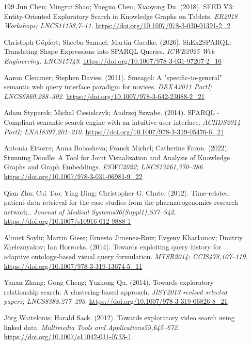 \documentclass[manuscript,review,screen]{acmart}
\begin{document}
\begin{thebibliography}{199}
 Jun Chen; Mingrui Shao; Yueguo Chen; Xiaoyong Du. (2018). SEED V3: Entity-Oriented Exploratory Search in Knowledge Graphs on Tablets. \textit{ER2018 Workshops; LNCS11158,7--11}. \url{https://doi.org/10.1007/978-3-030-01391-2_2}

 Christoph G\"{o}pfert; Sheeba Samuel; Martin Gaedke. (2026). ShEx2SPARQL: Translating Shape Expressions into SPARQL Queries. \textit{ICWE2025 Web Engineering, LNCS15749}. \url{https://doi.org/10.1007/978-3-031-97207-2_16}

 Aaron Clemmer; Stephen Davies. (2011). Smeagol: A "specific-to-general" semantic web query interface paradigm for novices. \textit{DEXA2011 PartI; LNCS6860,288--302}. \url{https://doi.org/10.1007/978-3-642-23088-2_21}

 Adam Styperek; Michal Ciesielczyk; Andrzej Szwabe. (2014). SPARQL - Compliant semantic search engine with an intuitive user interface. \textit{ACIIDS2014 PartI; LNAI8397,201--210}. \url{https://doi.org/10.1007/978-3-319-05476-6_21}

 Antonia Ettorre; Anna Bobasheva; Franck Michel; Catherine Faron. (2022). Stunning Doodle: A Tool for Joint Visualization and Analysis of Knowledge Graphs and Graph Embeddings. \textit{ESWC2022; LNCS13261,370--386}. \url{https://doi.org/10.1007/978-3-031-06981-9_22}

 Qian Zhu; Cui Tao; Ying Ding; Christopher G. Chute. (2012). Time-related patient data retrieval for the case studies from the pharmacogenomics research network.. \textit{Journal of Medical Systems36(Suppl1),S37--S42}. \url{https://doi.org/10.1007/s10916-012-9888-1}

 Ahmet Soylu; Martin Giese; Ernesto Jimenez-Ruiz; Evgeny Kharlamov; Dmitriy Zheleznyakov; Ian Horrocks. (2014). Towards exploiting query history for adaptive ontology-based visual query formulation. \textit{MTSR2014; CCIS478,107--119}. \url{https://doi.org/10.1007/978-3-319-13674-5_11}

 Yanan Zhang; Gong Cheng; Yuzhong Qu. (2014). Towards exploratory relationship search: A clustering-based approach. \textit{JIST2013 revised selected papers; LNCS8388,277--293}. \url{https://doi.org/10.1007/978-3-319-06826-8_21}

 J\"{o}rg Waitelonis; Harald Sack. (2012). Towards exploratory video search using linked data. \textit{Multimedia Tools and Applications59,645--672}. \url{https://doi.org/10.1007/s11042-011-0733-1}


\end{thebibliography}
\end{document}
